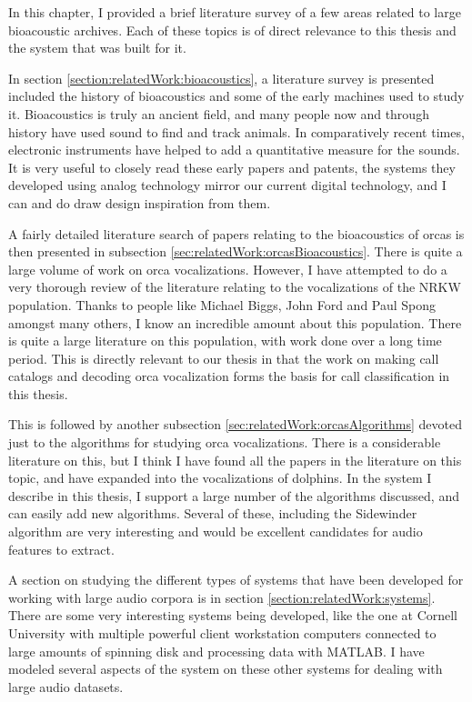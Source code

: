 \documentclass[12pt,oneside]{book}
\begin{document}
In this chapter, I provided a brief literature survey of a few areas
related to large bioacoustic archives.  Each of these topics is of
direct relevance to this thesis and the system that was built for it.

In section \ref{section:relatedWork:bioacoustics}, a literature survey
is presented included the history of bioacoustics and some of the
early machines used to study it.  Bioacoustics is truly an ancient
field, and many people now and through history have used sound to find
and track animals.  In comparatively recent times, electronic
instruments have helped to add a quantitative measure for the sounds.
It is very useful to closely read these early papers and patents, the
systems they developed using analog technology mirror our current
digital technology, and I can and do draw design inspiration from
them.

A fairly detailed literature search of papers relating to the
bioacoustics of orcas is then presented in subsection
\ref{sec:relatedWork:orcasBioacoustics}.  There is quite a large
volume of work on orca vocalizations.  However, I have attempted to do
a very thorough review of the literature relating to the vocalizations
of the NRKW population.  Thanks to people like Michael Biggs, John
Ford and Paul Spong amongst many others, I know an incredible amount
about this population.  There is quite a large literature on this
population, with work done over a long time period.  This is directly
relevant to our thesis in that the work on making call catalogs and
decoding orca vocalization forms the basis for call classification in
this thesis.

This is followed by another subsection
\ref{sec:relatedWork:orcasAlgorithms} devoted just to the algorithms
for studying orca vocalizations.  There is a considerable literature
on this, but I think I have found all the papers in the literature on
this topic, and have expanded into the vocalizations of dolphins.  In
the system I describe in this thesis, I support a large number of the
algorithms discussed, and can easily add new algorithms.  Several of
these, including the Sidewinder algorithm are very interesting and
would be excellent candidates for audio features to extract.

A section on studying the different types of systems that have been
developed for working with large audio corpora is in section
\ref{section:relatedWork:systems}.  There are some very interesting
systems being developed, like the one at Cornell University with
multiple powerful client workstation computers connected to large
amounts of spinning disk and processing data with MATLAB.  I have
modeled several aspects of the system on these other systems for
dealing with large audio datasets.
\end{document}

